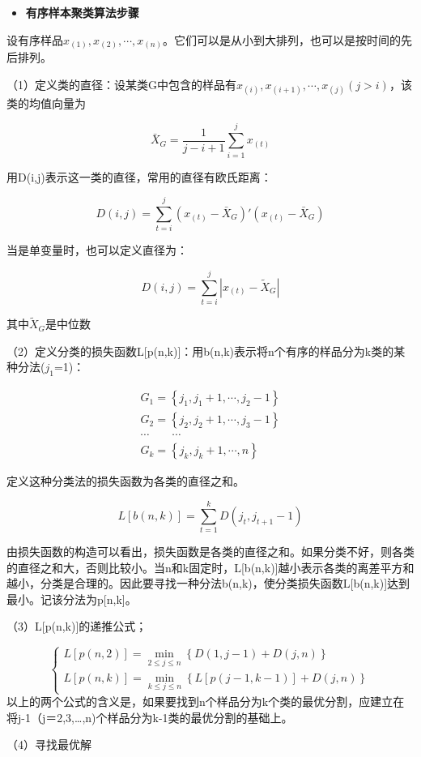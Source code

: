 \documentclass[]{ctexbook}
\providecommand{\tightlist}{%
  \setlength{\itemsep}{0pt}\setlength{\parskip}{0pt}}
\begin{document}
\begin{itemize}
\tightlist
\item
  \textbf{有序样本聚类算法步骤}
\end{itemize}

设有序样品\(x_{(1)},x_{(2)},\cdots,x_{(n)}\)。它们可以是从小到大排列，也可以是按时间的先后排列。

（1）定义类的直径：设某类G中包含的样品有\({ x_{(i)},x_{(i+1)},\cdots,x_{(j)} } (j> i)\)，该类的均值向量为

\[\bar X_G=\frac{1}{j-i+1}\sum_{i=1}^jx_{(t)}\]

用D(i,j)表示这一类的直径，常用的直径有欧氏距离：

\[D(i,j)=\sum_{t=i}^j(x_{(t)}-\bar X_G)'(x_{(t)}-\bar X_G)\]

当是单变量时，也可以定义直径为：

\[D(i,j)=\sum_{t=i}^j|x_{(t)}-\tilde X_G|\]

其中\(\tilde X_G\)是中位数

（2）定义分类的损失函数L{[}p(n,k){]}：用b(n,k)表示将n个有序的样品分为k类的某种分法(\(j_1\)=1)：

\[\begin{array}{lcl} G_1=\left\{j_1,j_1+1,\cdots,j_2-1\right\} \\ G_2=\left\{j_2,j_2+1,\cdots,j_3-1\right\} \\ \cdots\qquad \cdots \\G_k=\left\{j_k,j_k+1,\cdots,n\right\} \end{array}\]

定义这种分类法的损失函数为各类的直径之和。

\[L[b(n,k)]=\sum_{t=1}^kD(j_t,j_{t+1}-1)\]

由损失函数的构造可以看出，损失函数是各类的直径之和。如果分类不好，则各类的直径之和大，否则比较小。当n和k固定时，L{[}b(n,k){]}越小表示各类的离差平方和越小，分类是合理的。因此要寻找一种分法b(n,k)，使分类损失函数L{[}b(n,k){]}达到最小。记该分法为p{[}n,k{]}。

（3）L{[}p(n,k){]}的递推公式；

\[\begin{cases}L[p(n,2)]=\min_{2\le j\le n}\left\{D(1,j-1)+D(j,n)\right\} \\ L[p(n,k)]=\min_{k\le j\le n}\left\{L[p(j-1,k-1)]+D(j,n)\right\} \end{cases}\]
以上的两个公式的含义是，如果要找到n个样品分为k个类的最优分割，应建立在将j-1（j＝2,3,\ldots,n)个样品分为k-1类的最优分割的基础上。

（4）寻找最优解
\end{document}

